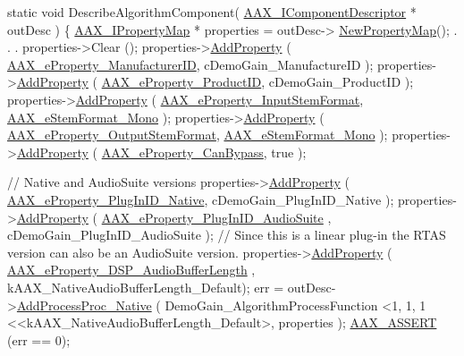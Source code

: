 \begin{DoxyCode}
\textcolor{keyword}{static} \textcolor{keywordtype}{void} DescribeAlgorithmComponent( \hyperlink{a00088}{AAX\_IComponentDescriptor} * outDesc )
\{
    \hyperlink{a00112}{AAX\_IPropertyMap} *          properties = outDesc->
      \hyperlink{a00088_a0d7dd21daa8bc588d6a1145c3eb7ef98}{NewPropertyMap}();
                    .
                    .
                    .       
    properties->Clear ();
    properties->\hyperlink{a00112_a0997671afce9a2367662c764c1d055dd}{AddProperty} ( \hyperlink{a00283_a6571f4e41a5dd06e4067249228e2249ea996465cca29a2a15291d1c788ac5728c}{AAX\_eProperty\_ManufacturerID}, 
      cDemoGain\_ManufactureID );
    properties->\hyperlink{a00112_a0997671afce9a2367662c764c1d055dd}{AddProperty} ( \hyperlink{a00283_a6571f4e41a5dd06e4067249228e2249ea3a41fcdff5af1a4fd19dcbca7b1ba6f3}{AAX\_eProperty\_ProductID}, 
      cDemoGain\_ProductID );
    properties->\hyperlink{a00112_a0997671afce9a2367662c764c1d055dd}{AddProperty} ( \hyperlink{a00283_a6571f4e41a5dd06e4067249228e2249eadebf03028b758123965a8b988fa2df99}{AAX\_eProperty\_InputStemFormat}, 
      \hyperlink{a00206_ad8af5ef008b2bd478add9a0acb0a1d85a0cc08ddb9923a4093c820efe84588947}{AAX\_eStemFormat\_Mono} );
    properties->\hyperlink{a00112_a0997671afce9a2367662c764c1d055dd}{AddProperty} ( \hyperlink{a00283_a6571f4e41a5dd06e4067249228e2249ea211fdc6277e7fa652b5d482e810b0bc9}{AAX\_eProperty\_OutputStemFormat}, 
      \hyperlink{a00206_ad8af5ef008b2bd478add9a0acb0a1d85a0cc08ddb9923a4093c820efe84588947}{AAX\_eStemFormat\_Mono} );
    properties->\hyperlink{a00112_a0997671afce9a2367662c764c1d055dd}{AddProperty} ( \hyperlink{a00283_a6571f4e41a5dd06e4067249228e2249ea6819867a9e86913e59decf318416d755}{AAX\_eProperty\_CanBypass}, \textcolor{keyword}{true} );

    \textcolor{comment}{// Native and AudioSuite versions}
    properties->\hyperlink{a00112_a0997671afce9a2367662c764c1d055dd}{AddProperty} ( \hyperlink{a00283_a6571f4e41a5dd06e4067249228e2249ea89ca3dd6e96895cda14976c1b1ceb826}{AAX\_eProperty\_PlugInID\_Native}, 
      cDemoGain\_PlugInID\_Native );
    properties->\hyperlink{a00112_a0997671afce9a2367662c764c1d055dd}{AddProperty} ( \hyperlink{a00283_a6571f4e41a5dd06e4067249228e2249ead3344696b8298a8b254add3d039ea927}{AAX\_eProperty\_PlugInID\_AudioSuite}
      , cDemoGain\_PlugInID\_AudioSuite );   \textcolor{comment}{// Since this is a linear plug-in the RTAS version can also be an
       AudioSuite version.}
    properties->\hyperlink{a00112_a0997671afce9a2367662c764c1d055dd}{AddProperty} ( \hyperlink{a00283_a6571f4e41a5dd06e4067249228e2249ea09fbd1cbcae0e86ad81005258dc1b67e}{AAX\_eProperty\_DSP\_AudioBufferLength}
      , kAAX\_NativeAudioBufferLength\_Default);
    err = outDesc->\hyperlink{a00088_a1c069508cf54a523905c8160ebf628ad}{AddProcessProc\_Native} ( DemoGain\_AlgorithmProcessFunction <1, 1, 1
      <<kAAX\_NativeAudioBufferLength\_Default>, properties ); \hyperlink{a00158_a168ee44fd7a5485ab50160db36fb2988}{AAX\_ASSERT} (err == 0);


\end{DoxyCode}

